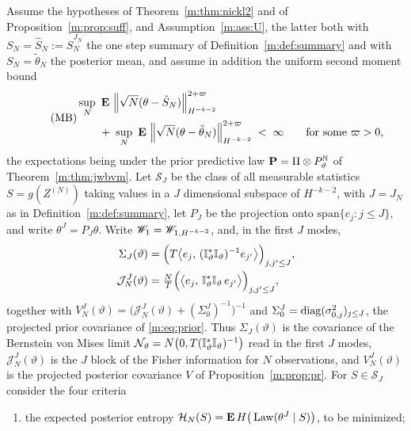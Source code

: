 \begin{proposition}\label{m:prop:abcopt}
Assume the hypotheses of Theorem~\ref{m:thm:nickl2} and of Proposition~\ref{m:prop:suff}, and Assumption~\ref{m:ass:U}, the latter both with $S_N=\hat S_N:=\hat S^{J_N}_N$ the one step summary of Definition~\ref{m:def:summary} and with $S_N=\tilde\theta_N$ the posterior mean, and assume in addition the uniform second moment bound
\begin{equation*}\label{m:eq:momentbound}\tag{MB}
\begin{split}
&\sup_N\ \mathbf{E}\,\left\|\sqrt N(\theta-\hat S_N)\right\|^{2+\varpi}_{H^{-k-2}}\\
&\qquad+\;\sup_N\ \mathbf{E}\,\left\|\sqrt N(\theta-\tilde\theta_N)\right\|^{2+\varpi}_{H^{-k-2}}\;<\;\infty\qquad\text{for some }\varpi>0 ,
\end{split}
\end{equation*}
the expectations being under the prior predictive law $\mathbf{P}=\Pi\otimes P^{\mathbb{N}}_\vartheta$ of Theorem~\ref{m:thm:jwbvm}. Let $\mathcal S_J$ be the class of all measurable statistics $S=g(Z^{(N)})$ taking values in a $J$ dimensional subspace of $H^{-k-2}$, with $J=J_N$ as in Definition~\ref{m:def:summary}, let $P_J$ be the projection onto $\mathrm{span}\{e_j:j\le J\}$, and write $\theta^J=P_J\theta$. Write $\mathscr{W}_1=\mathscr{W}_{1,H^{-k-2}}$, and, in the first $J$ modes,
\[
\begin{aligned}
\Sigma_J(\vartheta)&=\Big(T\big\langle e_j,\,(\mathbb{I}^*_\vartheta\mathbb{I}_\vartheta)^{-1}e_{j'}\big\rangle\Big)_{j,j'\le J},\\
\mathcal J^J_N(\vartheta)&=\tfrac NT\Big(\big\langle e_j,\,\mathbb{I}^*_\vartheta\mathbb{I}_\vartheta\,e_{j'}\big\rangle\Big)_{j,j'\le J},
\end{aligned}
\]
together with $V^J_N(\vartheta)=\big(\mathcal J^J_N(\vartheta)+(\Sigma^J_0)^{-1}\big)^{-1}$ and $\Sigma^J_0=\operatorname{diag}(\sigma^2_{0,j})_{j\le J}$, the projected prior covariance of \eqref{m:eq:prior}. Thus $\Sigma_J(\vartheta)$ is the covariance of the Bernstein von Mises limit $\mathcal{N}_\vartheta=N\big(0,T(\mathbb{I}^*_\vartheta\mathbb{I}_\vartheta)^{-1}\big)$ read in the first $J$ modes, $\mathcal J^J_N(\vartheta)$ is the $J$ block of the Fisher information for $N$ observations, and $V^J_N(\vartheta)$ is the projected posterior covariance $V$ of Proposition~\ref{m:prop:pr}. For $S\in\mathcal S_J$ consider the four criteria
\begin{enumerate}[label=(\roman*),nosep]
\item the expected posterior entropy $\mathcal H_N(S)=\mathbf{E}\,H\big(\operatorname{Law}(\theta^J\mid S)\big)$, to be minimized;

\end{enumerate}
\end{proposition}
